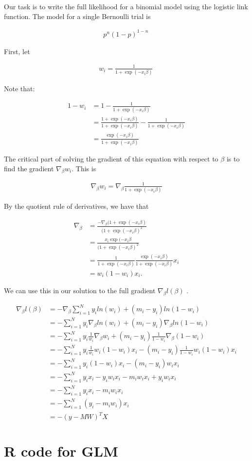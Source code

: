 \documentclass{article}
\begin{document}
Our task is to write the full likelihood for a binomial model using the logistic link function. The model for a single Bernoulli trial is 

\begin{align} 
	p^n (1 - p)^{1-n}\, 
\end{align}

First, let 

\begin{align} 
	w_i = \frac{1}{1 + \exp(-x_i\beta)} \,
\end{align}

Note that: 

\begin{align} 
	1 - w_i &= 1 - \frac{1}{1 + \exp(-x_i\beta)} \\
	 &= \frac{1 + \exp(-x_i\beta)}{1 + \exp(-x_i\beta)} - \frac{1}{1 + \exp(-x_i\beta)} \\
	 &= \frac{\exp(-x_i\beta)}{1 + \exp(-x_i\beta)}
\end{align}

The critical part of solving the gradient of this equation with respect to $\beta$ is to find the gradient $\nabla_{\beta} w_i$. This is

\begin{align}
	\nabla_{\beta}w_i = \nabla_{\beta} \frac{1}{1 + \exp(-x_i\beta)}
\end{align}

By the quotient rule of derivatives, we have that 

\begin{align}
	\nabla_{\beta} &= \frac{-\nabla_{\beta}(1 + \exp(-x_i\beta)}{(1 + \exp(-x_i\beta)^2}\\
	&= \frac{x_i \exp(-x_i\beta}{(1 + \exp(-x_i\beta)^2} \\
	&= \frac{1}{1 + \exp(-x_i\beta)}\frac{\exp(-x_i\beta)}{1 + \exp(-x_i\beta)} x_i \\
	&= w_i (1 - w_i) x_i . 
\end{align}


We can use this in our solution to the full gradient $\nabla_{\beta} l(\beta)$ .

\begin{align}
	\nabla_{\beta} l(\beta) &= -\nabla_{\beta}\sum_{i = 1}^N y_i ln(w_i) + (m_i - y_i) ln (1 - w_i) \\
	&= -\sum_{i = 1}^N y_i \nabla_{\beta} ln(w_i) + (m_i - y_i) \nabla_{\beta}ln(1 - w_i) \\
	&= -\sum_{i = 1}^N y_i \frac{1}{w_i}\nabla_{\beta}w_i + (m_i - y_i) \frac{1}{1 - w_i} \nabla_{\beta}(1 - w_i)\\
	&= -\sum_{i = 1}^N y_i \frac{1}{w_i} w_i (1 - w_i)x_i - (m_i - y_i) \frac{1}{1 - w_i} w_i (1 - w_i) x_i \\
	&= -\sum_{i = 1}^N y_i (1 - w_i)x_i - (m_i - y_i) w_i x_i \\
	&= -\sum_{i = 1}^N y_i x_i - y_i w_i x_i -m_i w_i x_i + y_i w_i x_i \\
	&= -\sum_{i = 1}^N y_i x_i - m_i w_i x_i \\
	&= -\sum_{i = 1}^N (y_i - m_i w_i) x_i \\
	&= -{(y - M W)^T X}
\end{align}


\section{R code for GLM}
\begin{lstlisting}



\end{lstlisting}
\end{document}
